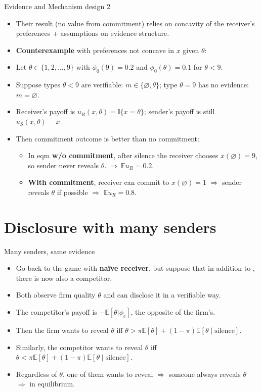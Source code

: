 \documentclass[english,10pt
,aspectratio=169
]{beamer}
\begin{document}
\begin{frame}{Evidence and Mechanism design 2}
\begin{itemize}
	\item Their result (no value from commitment) relies on concavity of the receiver's preferences + assumptions on evidence structure. 
	\item \textbf{Counterexample} with preferences not concave in $x$ given $\theta$:
	\item Let $\theta \in \{1,2,...,9\}$ with $\phi_0(9) = 0.2$ and $\phi_0(\theta) = 0.1$ for $\theta < 9$.
	\item Suppose types $\theta<9$ are verifiable: $m \in \{\varnothing, \theta\}$; type $\theta=9$ has no evidence: $m = \varnothing$.
	\item Receiver's payoff is $u_R(x,\theta) = \mathbb{I}\{x=\theta\}$; sender's payoff is still $u_S(x,\theta)=x$.
	\pause \bigskip 
	\item Then commitment outcome is better than no commitment:
	\begin{itemize}
		\item In eqm \textbf{w/o commitment}, after silence the receiver chooses $x(\varnothing)=9$, so sender never reveals $\theta$. $\Rightarrow \, \mathbb{E}u_R = 0.2$.
		\item \textbf{With commitment}, receiver can commit to $x(\varnothing)=1$ $\Rightarrow$ sender reveals $\theta$ if possible $\Rightarrow$ $\mathbb{E}u_R = 0.8$.
	\end{itemize}
\end{itemize}
\end{frame}


\section{Disclosure with many senders}

\begin{frame}{Many senders, same evidence \citep{milgrom_relying_1986}}
\begin{itemize}
	\item Go back to the game with \textbf{na{\"i}ve receiver}, but suppose that in addition to , there is now also \alert{a competitor}.
	\item Both observe firm quality $\theta$ and can disclose it in a verifiable way.
	\item The competitor's payoff is $-\mathbb{E}[\theta|\phi_c]$, the opposite of the firm's.
	
	\pause\bigskip 
	\item Then the firm wants to reveal $\theta$ iff $\theta > \pi \mathbb{E}[\theta] + (1-\pi) \mathbb{E}[\theta \mid \text{silence}]$.
	\item Similarly, the competitor wants to reveal $\theta$ iff $\theta < \pi \mathbb{E}[\theta] + (1-\pi) \mathbb{E}[\theta \mid \text{silence}]$.
	\item Regardless of $\theta$, one of them wants to reveal $\Rightarrow$ someone always reveals $\theta$ \\
	$\Rightarrow$  in equilibrium.
\end{itemize}
\end{frame}
\end{document}
